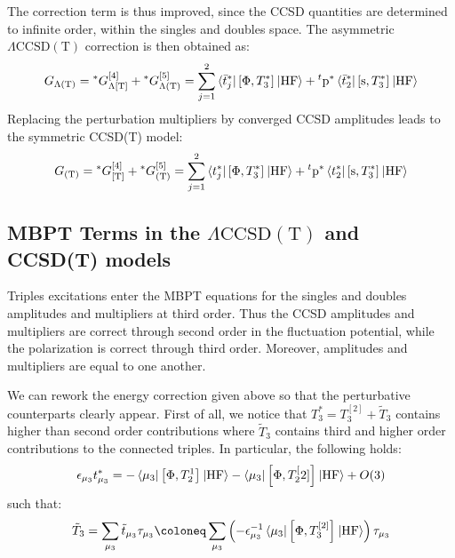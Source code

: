 The correction term is thus improved, since the \acs{CCSD} quantities
are determined to infinite order, within the singles and doubles space.
The asymmetric $\Lambda\text{CCSD}(\text{T})$ correction is then
obtained as:
\begin{equation}\label{eq:5-lambda-parens-t}
 \begin{aligned}
  G_{\Lambda(\text{T})} =
  {}^*G_{\Lambda[\text{T}]}^{[4]} +
  {}^*G_{\Lambda(\text{T})}^{[5]} =
  \sum_{j=1}^2
    \braket{\bar{t}_{j}^{*} | \left[ \Phi, T_3^{*} \right]^{} | \mathrm{HF}}
  + {}^t\mathrm{p}^{*}\braket{\bar{t}_{2}^{*} | \left[ \mathrm{s}, T_3^{*} \right]^{} | \mathrm{HF}}
 \end{aligned}
\end{equation}
Replacing the perturbation multipliers by converged \acs{CCSD}
amplitudes leads to the symmetric CCSD(T) model:
\begin{equation}\label{eq:5-parens-t}
 \begin{aligned}
  G_{(\text{T})} =
  {}^*G_{[\text{T}]}^{[4]} +
  {}^*G_{(\text{T})}^{[5]} =
  \sum_{j=1}^2
    \braket{t_{j}^{*} | \left[ \Phi, T_3^{*} \right]^{} | \mathrm{HF}}
  + {}^t\mathrm{p}^{*}\braket{t_{2}^{*} | \left[ \mathrm{s}, T_3^{*} \right]^{} | \mathrm{HF}}
 \end{aligned}
\end{equation}

\subsection{MBPT Terms in the
\texorpdfstring{$\Lambda\text{CCSD}(\text{T})$}{CCSD(aT)} and CCSD(T) models}

Triples excitations enter the \acs{MBPT} equations for the singles and
doubles amplitudes and multipliers at third order. Thus the \acs{CCSD}
amplitudes and multipliers are correct through second order in the
fluctuation potential, while the polarization is correct through third
order. Moreover, amplitudes and multipliers are equal to one another.

We can rework the energy correction given above so that the perturbative
counterparts clearly appear.
First of all, we notice that $T_3^{*} = T_3^{[2]} + \tilde{T}_3$ contains higher than second order
contributions where $\tilde{T}_3$ contains third and higher order contributions to the
connected triples. In particular, the following holds:
\begin{equation}
  \epsilon_{\mu_3}t_{\mu_3}^{*} =
  - \braket{\mu_3 |\left[ \Phi, T_2^{1} \right]^{} | \mathrm{HF}}
  - \braket{\mu_3 | \left[ \Phi, T_2^[2] \right]^{} | \mathrm{HF}}
  + O(3)
\end{equation}
such that:
\begin{equation}
  \tilde{T}_3
  = \sum_{\mu_3}\tilde{t}_{\mu_3}\cluster{\mu_3}
  \coloneq \sum_{\mu_3}
  \left(-\denom{\mu_3}^{-1}\braket{\mu_3 |
  \commutator{\Phi}{T_3^{[2]}}
  | \mathrm{HF}}\right)
  \cluster{\mu_3}
\end{equation}

